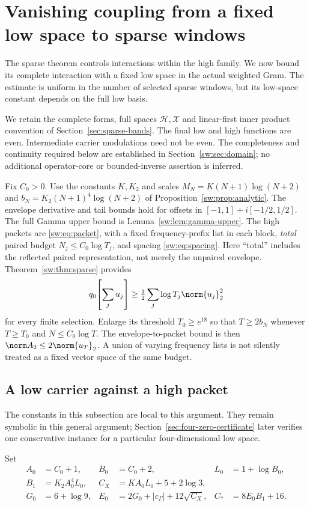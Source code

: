 \documentclass[11pt,a4paper]{article}
\numberwithin{equation}{section}
\theoremstyle{definition}\newtheorem{definition}[theorem]{Definition}
\theoremstyle{remark}\newtheorem{remark}[theorem]{Remark}
\begin{document}
\section{Vanishing coupling from a fixed low space to sparse windows}\label{sec:low-sparse}
The sparse theorem controls interactions within the high family. We now
bound its complete interaction with a fixed low space in the actual
weighted Gram. The estimate is uniform in the number of selected sparse
windows, but its low-space constant depends on the full low basis.

We retain the complete forms, full spaces $\mathscr H,\mathscr X$ and
linear-first inner product convention of Section~\ref{sec:sparse-bands}.
The final low and high functions are even. Intermediate carrier
modulations need not be even. The completeness and continuity required
below are established in Section~\ref{sw:sec:domain}; no additional
operator-core or bounded-inverse assertion is inferred.

Fix $C_0>0$. Use the constants $K,K_2$ and scales
$M_N=K(N+1)\log(N+2)$ and $b_N=K_2(N+1)^4\log(N+2)$ of
Proposition~\ref{sw:prop:analytic}. The envelope derivative and tail bounds
hold for offsets in $[-1,1]+i[-1/2,1/2]$. The full Gamma upper bound is
Lemma~\ref{sw:lem:gamma-upper}. The high packets are
\eqref{sw:eq:packet}, with a fixed frequency-prefix list in each block,
\emph{total} paired budget $N_j\le C_0\log T_j$, and spacing
\eqref{sw:eq:spacing}. Here ``total'' includes the reflected paired
representation, not merely the unpaired envelope. Theorem~\ref{sw:thm:sparse}
provides
\[
 q_0\!\left[\sum_j u_j\right]\ge\tfrac12
       \sum_j\log T_j\norm{u_j}_2^2
\]
for every finite selection. Enlarge its threshold $T_0\ge e^{18}$ so
that $T\ge2b_N$ whenever $T\ge T_0$ and $N\le C_0\log T$.
The envelope-to-packet bound is then
$\norm A_2\le2\norm{u_T}_2$. A union of varying frequency lists is not
silently treated as a fixed vector space of the same budget.

\subsection{A low carrier against a high packet}
The constants in this subsection are local to this argument. They remain symbolic in this general argument;
Section~\ref{sec:four-zero-certificate} later verifies one conservative
instance for a particular four-dimensional low space.

Set
\begin{align*}
 A_0&=C_0+1,&B_0&=C_0+2,&L_0&=1+\log B_0,\\
 B_1&=K_2A_0^4L_0,& C_X&=KA_0L_0+5+2\log3,\\
 G_0&=6+\log9,& E_0&=2G_0+|c_\Gamma|+12\sqrt{C_X},
 &C_*&=8E_0B_1+16.
\end{align*}
\end{document}
